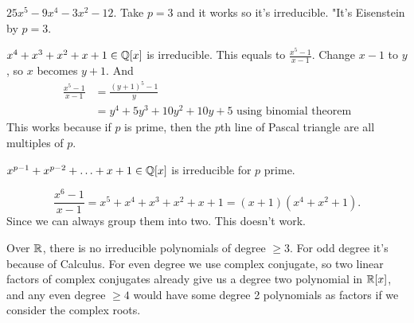 \documentclass[class=article,crop=false]{standalone}
\begin{document}
\begin{eg}[]
$ 25x^{5} - 9x^{4} - 3x^2-12$. Take $ p=3$ and it works so it's irreducible. "It's Eisenstein by  $ p=3 $.
\end{eg}

\begin{eg}[]
	$ x^{4}+x^3+ x^2 + x +1 \in \mathbb{Q}[x]$ is irreducible. This equals to $ \frac{x^{5}-1}{x-1 }$. Change $ x-1$ to  $ y$, so  $ x $ becomes  $ y+1$. And
	 \begin{align*}
		 \frac{x^{5}-1}{x-1 }&= \frac{(y+1)^{5}-1}{y } \\
		 &= y^{4}+ 5 y^3 + 10 y^2 + 10 y + 5 \text{ using binomial theorem} 
	\end{align*}
	This works because if $ p$ is prime, then the  $ p$th line of Pascal triangle are all multiples of  $ p$.
\end{eg}

\begin{thm}[]
	$ x^{p-1}+ x^{p-2}+ \ldots+ x+1 \in \mathbb{Q}[x]$ is irreducible for $ p$ prime.
\end{thm}

\begin{eg}[]
\[
	\frac{x^{6}-1}{x-1 } = x^{5} + x^{4}+ x^{3}+ x^{2}+ x+ 1 = (x+1) (x^{4}+ x^2 + 1)
.\] 
Since we can always group them into two. This doesn't work.
\end{eg}

\begin{claim}[]
	Over $ \mathbb{R}$, there is no irreducible polynomials of degree $ \geq 3$. For odd degree it's because of Calculus. For even degree we use complex conjugate, so two linear factors of complex conjugates already give us a degree two polynomial in $ \mathbb{R}[x]$, and any even degree $ \geq 4$ would have some degree 2 polynomials as factors if we consider the complex roots.
\end{claim}
\end{document}

